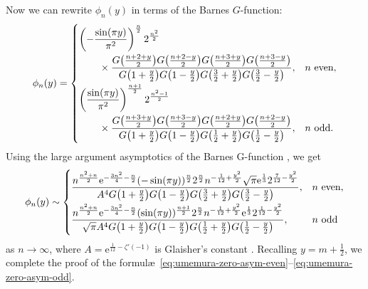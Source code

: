 \documentclass[pdftex]{sigma}
\numberwithin{equation}{section}
\newcommand{\ee}{\mathrm{e}}
\begin{document}
Now we can rewrite $\phi_n(y)$ in terms of the Barnes $G$-function:
\begin{gather*}
\phi_{n}(y)=\begin{cases} \displaystyle
 \left(-\frac{\sin(\pi y)}{\pi^2}\right)^\frac{n}{2} 2^\frac{n^2}{2}\vspace{1mm}\\
 \qquad\displaystyle{}\times\frac{G\big(\frac{n + 2 + y}{2}\big)G\big(\frac{n + 2 - y}{2}\big)G\big(\frac{n + 3 + y}{2}\big)G\big(\frac{n + 3 - y}{2}\big)}{G\big(1+\frac{y}{2}\big)G\big(1-\frac{y}{2}\big)G\big(\frac32+\frac{y}{2}\big)G\big(\frac32-\frac{y}{2}\big)},
 &\text{$n$ even}, \vspace{1mm}\\
 \displaystyle \left(\frac{\sin(\pi y)}{\pi^2}\right)^\frac{n+1}{2}2^\frac{n^2-1}{2} \vspace{1mm}\\
 \qquad\displaystyle{}\times{\frac{G\big(\frac{n+3 + y}{2}\big)G\big(\frac{n+3 - y}{2}\big)G\big(\frac{n+2 + y}{2}\big)G\big(\frac{n+2 - y}{2}\big)}{G\big(1+\frac{y}{2}\big)G\big(1-\frac{y}{2}\big)G\big(\frac12+\frac{y}{2}\big)G\big(\frac12-\frac{y}{2}\big)}}, &{\text{$n$ odd.}}
\end{cases}
\end{gather*}
Using the large argument asymptotics of the Barnes G-function \cite[equation~(5.17.5)]{DLMF}, we get
\begin{gather*}
\phi_{n}(y)\sim \begin{cases} \displaystyle
 \frac{n^{\frac{n^2+n}{2}}\ee^{-\frac{3n^2}{4}-\frac{n}{2}}(-\sin(\pi y))^\frac{n}{2}2^{\frac{n}{2}}n^{-\frac{1}{12}+\frac{y^2}{2}}\sqrt{\pi}\ee^{\frac{1}{3}}2^{\frac{7}{12}-\frac{y ^2}{2}}}{A^4G\big(1+\frac{y}{2}\big)G\big(1-\frac{y}{2}\big)G\big(\frac32+\frac{y}{2}\big)G\big(\frac32-\frac{y}{2}\big)},& \text{$n$ even}, \vspace{1mm}\\
 \displaystyle \frac{n^{\frac{n^2+n}{2}}\ee^{-\frac{3n^2}{4}-\frac{n}{2}}(\sin(\pi y))^\frac{n+1}{2}2^{\frac{n}{2}}n^{-\frac{1}{12}+\frac{y^2}{2}}\ee^{\frac{1}{3}}2^{\frac{1}{12}-\frac{y^2}{2}}} {\sqrt{\pi}A^4G\big(1+\frac{y}{2}\big)G\big(1-\frac{y}{2}\big)G\big(\frac12+\frac{y}{2}\big)G\big(\frac12-\frac{y}{2}\big)},& \text{$n$ odd}
\end{cases}
\end{gather*}
as $n\to\infty$, where $A=\ee^{\frac{1}{12}-\zeta'(-1)}$ is Glaisher's constant \cite[equation~(5.17.6)]{DLMF}. Recalling $y=m+\frac{1}{2}$, we complete the proof of the formul\ae\ \eqref{eq:umemura-zero-asym-even}--\eqref{eq:umemura-zero-asym-odd}.
\end{document}
